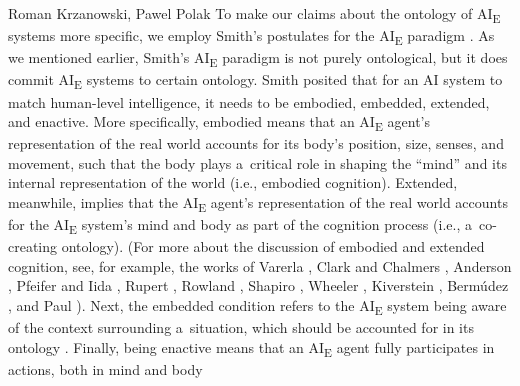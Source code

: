 \begin{artengenv2auth}{Roman Krzanowski, Pawel Polak}
To make our claims about the ontology of AI\textsubscript{E} systems more specific, we employ Smith's postulates for the AI\textsubscript{E} paradigm
\parencite[][p.44]{smith_promise_2019}. %
 As we mentioned earlier, Smith's AI\textsubscript{E} paradigm is not purely ontological, but it does commit AI\textsubscript{E} systems to certain ontology. Smith posited that for an AI system to match human-level intelligence, it needs to be embodied, embedded, extended, and enactive. More specifically, embodied means that an AI\textsubscript{E} agent's representation of the real world accounts for its body's position, size, senses, and movement, such that the body plays a~critical role in shaping the ``mind'' and its internal representation of the world (i.e., embodied cognition). Extended, meanwhile, implies that the AI\textsubscript{E} agent's representation of the real world accounts for the AI\textsubscript{E} system's mind and body as part of the cognition process (i.e., a~co-creating ontology). (For more about the discussion of embodied and extended cognition, see, for example, the works of Varerla 
\parencite*[][]{varela_embodied_1991}, %
 Clark and Chalmers 
\parencite*[][]{clark_extended_1998}, %
 Anderson 
\parencite*[][]{anderson_embodied_2003}, %
 Pfeifer and Iida 
\parencite*[][]{pfeifer_embodied_2004}, %
 Rupert 
\parencite*[][]{rupert_cognitive_2009}, %
 Rowland 
\parencite*[][]{rowlands_new_2010}, %
 Shapiro 
\parencite*[][]{shapiro_embodied_2010}, %
 Wheeler 
\parencite*[][]{garvey_embodied_2011}, %
 Kiverstein 
\parencite*[][]{kiverstein_extended_2018}, %
 Bermúdez 
\parencite*[][]{hernandez-orallo_ai_2020}, %
 and Paul 
\parencite*[][]{paul_extended_2021}%
). Next, the embedded condition refers to the AI\textsubscript{E} system being aware of the context surrounding a~situation, which should be accounted for in its ontology 
\parencites[e.g.,][]{hutchins_cognition_1995}[van][]{pouw_embedded_2014}. %
 Finally, being enactive means that an AI\textsubscript{E} agent fully participates in actions, both in mind and body 

\end{artengenv2auth}
